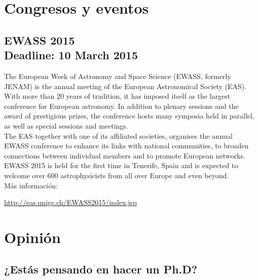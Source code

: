 \documentclass{book}
\begin{document}
\section*{Congresos y eventos}

\subsection{EWASS 2015\\ Deadline: 10 March 2015}

The European Week of Astronomy and Space Science (EWASS, formerly JENAM) is the annual meeting of the European Astronomical Society (EAS). With more than 20 years of tradition, it has imposed itself as the largest conference for European astronomy. In addition to plenary sessions and the award of prestigious prizes, the conference hosts many symposia held in parallel, as well as special sessions and meetings.\\

\noindent The EAS together with one of its affiliated societies, organises the annual EWASS conference to enhance its links with national communities, to broaden connections between individual members and to promote European networks.\\

\noindent EWASS 2015 is held for the first time in Tenerife, Spain and is expected to welcome over 600 astrophysicists from all over Europe and even beyond.\\

\noindent Más información:
\begin{center}
\url{ http://eas.unige.ch/EWASS2015/index.jsp}
\end{center}


\section*{Opinión}

\subsection{¿Estás pensando en hacer un Ph.D?}
\end{document}
